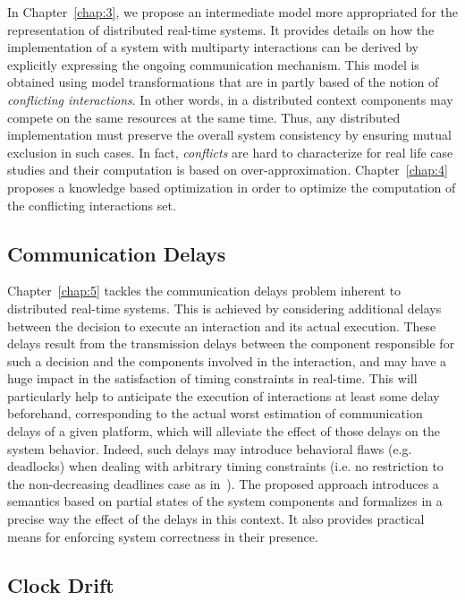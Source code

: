 In Chapter~\ref{chap:3}, we propose an intermediate model more appropriated for the 
representation of distributed real-time systems. It provides details on how the 
implementation of a system with multiparty interactions can be derived by explicitly expressing
the ongoing communication mechanism. This model is obtained using model transformations that
are in partly based of the notion of \emph{conflicting interactions}. In other words,
in a distributed context components may compete on the same resources at the same time. Thus,
any distributed implementation must preserve the overall system consistency by ensuring 
mutual exclusion in such cases. In fact, \emph{conflicts} are hard to characterize for real life
case studies and their computation is based on over-approximation. Chapter~\ref{chap:4} proposes
a knowledge based optimization in order to optimize the computation of the conflicting 
interactions set.


\subsection*{Communication Delays}

Chapter~\ref{chap:5} tackles the communication delays problem inherent to distributed real-time
systems. This is achieved by considering additional delays between the decision to execute 
an interaction and its actual execution. These delays result from the transmission
delays between the component responsible for such a decision and the components involved in
the interaction, and may have a huge impact in the satisfaction of timing constraints in 
real-time.
This will particularly help to anticipate the execution of interactions at 
least some delay beforehand, corresponding to the actual worst estimation of communication 
delays of a given platform, which will alleviate the effect of those delays on the system 
behavior.
Indeed, such delays may introduce behavioral flaws (e.g. deadlocks) when dealing with
arbitrary timing constraints (i.e. no restriction to the non-decreasing deadlines case
as in~\cite{ahlem_these}). The proposed approach introduces a semantics based on partial states
of the system components and formalizes in a precise way the effect of the delays
in this context. It also provides practical means for enforcing system correctness in their 
presence. 

\subsection*{Clock Drift}

